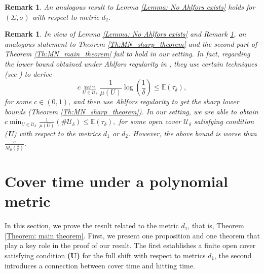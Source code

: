 \documentclass[11pt, reqno]{amsart}
\theoremstyle{plain}%
\newtheorem{remark}[theorem]{Remark}
\theoremstyle{definition}
\theoremstyle{definition}
\def\U{\ensuremath{\mathcal U}}
\def\E{\mathbb E}
\numberwithin{equation}{section}
\begin{document}
\begin{remark}\label{Remark: No Ahlfors exists for d_2}
    An analogous result to Lemma \ref{Lemma: No Ahlfors exists} holds for $(\Sigma,\sigma)$ with respect to metric $d_2$.
\end{remark}
\begin{remark}\label{Remark: No Sharp Bound}
    In view of Lemma \ref{Lemma: No Ahlfors exists} and Remark \ref{Remark: No Ahlfors exists for d_2}, an analogous statement to Theorem \ref{Th:MN_sharp_theorem} and the second part of Theorem \ref{Th:MN_main_theorem} fail to hold in our setting. In fact, regarding the lower bound obtained under Ahlfors regularity in \cite{MikeNatali}, they use certain techniques (see \cite[Section 5]{MikeNatali}) to derive $$c\min_{U\in\U_\delta}\frac{1}{\mu(U)}\log\left(\frac{1}{\delta}\right)\le \E(\tau_\delta), $$ for some $c\in(0,1)$, and then use Ahlfors regularity to get the sharp lower bounds (Theorem \ref{Th:MN_sharp_theorem}). In our setting, we are able to obtain $c\min_{U\in\U_\delta}\frac{1}{\mu(U)}(\#\U_\delta)\le \E(\tau_\delta),$ for some open cover $\U_\delta$ satisfying condition (\textbf{U}) with respect to the metrics $d_1$ or $d_2$. However, the above bound is worse than $\frac{c}{M_\mu\left(\frac{\delta}{\varepsilon}\right)}$.  
\end{remark}

\section{Cover time under a polynomial metric}\label{Section: Propositions}

In this section, we prove the result related to the metric $d_1$, that is, Theorem \ref{Theorem: main theorem}. First, we present one proposition and one theorem that play a key role in the proof of our result. The first establishes a finite open cover satisfying condition \hyperref[Condition (U)]{\textbf{(U)}} for the full shift with respect to metrics $d_1$, the second introduces a connection between cover time and hitting time.
\end{document}
